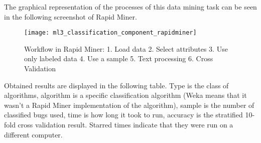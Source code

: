 The graphical representation of the processes of this data mining task can be seen in the following screenshot of Rapid Miner.

\begin{figure}
\begin{center}
\texttt{[image: ml3\_classification\_component\_rapidminer]}
\caption{Workflow in Rapid Miner: 1. Load data 2. Select attributes 3. Use only labeled data 4. Use a sample 5. Text processing 6. Cross Validation}
\end{center}
\end{figure}

Obtained results are displayed in the following table. Type is the class of algorithms, algorithm is a specific classification algorithm (Weka means that it wasn't a Rapid Miner implementation of the algorithm), sample is the number of classified bugs used, time is how long it took to run, accuracy is the stratified 10-fold cross validation result. Starred times indicate that they were run on a different computer.

